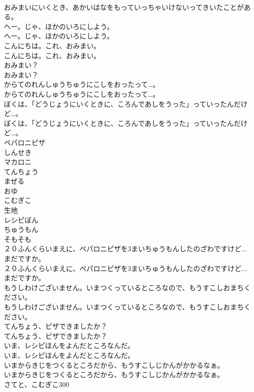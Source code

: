 \documentclass[8pt]{extreport}
\begin{document}
\begin{CJK}{UTF8}{min}
\\	おみまいにいくとき、あかいはなをもっていっちゃいけないってきいたことがある。 
\\	へー。じゃ、ほかのいろにしよう。	
\\	へー。じゃ、ほかのいろにしよう。 
\\	こんにちは。これ、おみまい。	
\\	こんにちは。これ、おみまい。 
\\	おみまい？	
\\	おみまい？ 
\\	からてのれんしゅうちゅうにこしをおったって…。	
\\	からてのれんしゅうちゅうにこしをおったって…。 
\\	ぼくは、「どうじょうにいくときに、ころんであしをうった」っていったんだけど…。	
\\	ぼくは、「どうじょうにいくときに、ころんであしをうった」っていったんだけど…。 
\\	ペパロニピザ
\\	しんせき
\\	マカロニ
\\	てんちょう
\\	まぜる
\\	おゆ
\\	こむぎこ
\\	生地
\\	レシピぼん
\\	ちゅうもん
\\	そもそも
\\	２０ふんくらいまえに、ペパロニピザを3まいちゅうもんしたのざわですけど...まだですか。	
\\	２０ふんくらいまえに、ペパロニピザを3まいちゅうもんしたのざわですけど...まだですか。 
\\	もうしわけございません。いまつくっているところなので、もうすこしおまちください。	
\\	もうしわけございません。いまつくっているところなので、もうすこしおまちください。 
\\	てんちょう、ピザできましたか？	
\\	てんちょう、ピザできましたか？ 
\\	いま、レシピほんをよんだところなんだ。	
\\	いま、レシピほんをよんだところなんだ。 
\\	いまからきじをつくるところだから、もうすこしじかんがかかるなぁ。	
\\	いまからきじをつくるところだから、もうすこしじかんがかかるなぁ。 
\\	さてと、こむぎこ300

\end{CJK}
\end{document}
